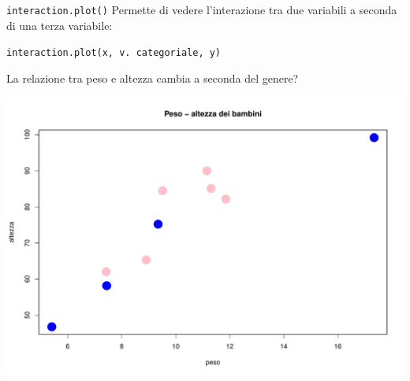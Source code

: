 \documentclass[
  ignorenonframetext,
]{beamer}
\begin{document}
\begin{frame}[fragile]{\texttt{interaction.plot()}}
\protect\hypertarget{interaction.plot}{}
Permette di vedere l'interazione tra due variabili a seconda di una
terza variabile:

\texttt{interaction.plot(x,\ v.\ categoriale,\ y)}

\pause

La relazione tra peso e altezza cambia a seconda del genere?

\begin{center}\includegraphics[width=0.7\linewidth]{Practice_files/figure-beamer/unnamed-chunk-55-1} \end{center}
\end{frame}
\end{document}
